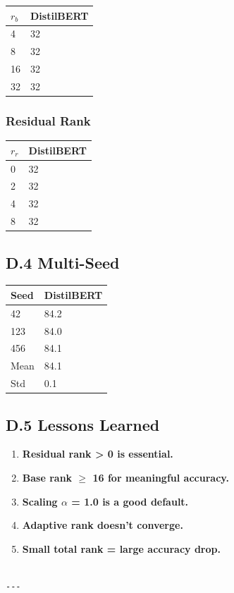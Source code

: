 \begin{table}[H]
\centering
\small
\begin{tabular}{ll}
\toprule
\textbf{$r_b$} & \textbf{DistilBERT} \\
\midrule
4 & 32 \\
8 & 32 \\
16 & 32 \\
32 & 32 \\
\bottomrule
\end{tabular}
\end{table}

\subsubsection{Residual Rank}

\begin{table}[H]
\centering
\small
\begin{tabular}{ll}
\toprule
\textbf{$r_r$} & \textbf{DistilBERT} \\
\midrule
0 & 32 \\
2 & 32 \\
4 & 32 \\
8 & 32 \\
\bottomrule
\end{tabular}
\end{table}

\subsection{D.4 Multi-Seed}

\begin{table}[H]
\centering
\small
\begin{tabular}{ll}
\toprule
\textbf{Seed} & \textbf{DistilBERT} \\
\midrule
42 & 84.2 \\
123 & 84.0 \\
456 & 84.1 \\
Mean & 84.1 \\
Std & 0.1 \\
\bottomrule
\end{tabular}
\end{table}

\subsection{D.5 Lessons Learned}

\begin{enumerate}
\item \textbf{Residual rank \textgreater{} 0 is essential.}
\item \textbf{Base rank $\ge$ 16 for meaningful accuracy.}
\item \textbf{Scaling $\alpha$ = 1.0 is a good default.}
\item \textbf{Adaptive rank doesn't converge.}
\item \textbf{Small total rank = large accuracy drop.}
\end{enumerate}
\begin{lstlisting}

---
\end{lstlisting}

